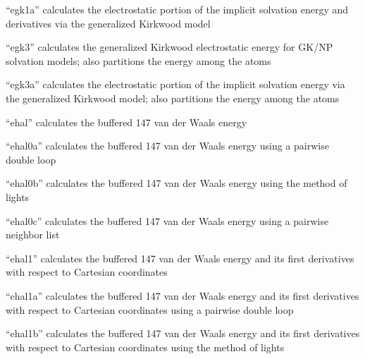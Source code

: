 \documentclass[letterpaper,11pt,english]{sphinxmanual}
\begin{document}
\sphinxAtStartPar
{}

\sphinxAtStartPar
“egk1a” calculates the electrostatic portion of the implicit solvation energy and derivatives via the generalized Kirkwood model

\sphinxAtStartPar
{}

\sphinxAtStartPar
“egk3” calculates the generalized Kirkwood electrostatic energy for GK/NP solvation models; also partitions the energy among the atoms

\sphinxAtStartPar
{}

\sphinxAtStartPar
“egk3a” calculates the electrostatic portion of the implicit solvation energy via the generalized Kirkwood model; also partitions the energy among the atoms

\sphinxAtStartPar
{}

\sphinxAtStartPar
“ehal” calculates the buffered 14\sphinxhyphen{}7 van der Waals energy

\sphinxAtStartPar
{}

\sphinxAtStartPar
“ehal0a” calculates the buffered 14\sphinxhyphen{}7 van der Waals energy using a pairwise double loop

\sphinxAtStartPar
{}

\sphinxAtStartPar
“ehal0b” calculates the buffered 14\sphinxhyphen{}7 van der Waals energy using the method of lights

\sphinxAtStartPar
{}

\sphinxAtStartPar
“ehal0c” calculates the buffered 14\sphinxhyphen{}7 van der Waals energy using a pairwise neighbor list

\sphinxAtStartPar
{}

\sphinxAtStartPar
“ehal1” calculates the buffered 14\sphinxhyphen{}7 van der Waals energy and its first derivatives with respect to Cartesian coordinates

\sphinxAtStartPar
{}

\sphinxAtStartPar
“ehal1a” calculates the buffered 14\sphinxhyphen{}7 van der Waals energy and its first derivatives with respect to Cartesian coordinates using a pairwise double loop

\sphinxAtStartPar
{}

\sphinxAtStartPar
“ehal1b” calculates the buffered 14\sphinxhyphen{}7 van der Waals energy and its first derivatives with respect to Cartesian coordinates using the method of lights
\end{document}
